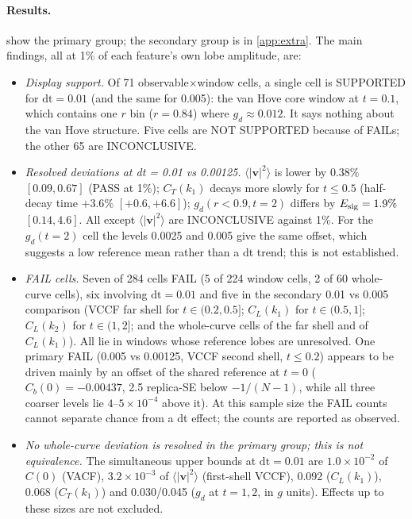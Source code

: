 \documentclass[11pt]{article}
\DeclareRobustCommand{\_}{\textunderscore\allowbreak}
\theoremstyle{remark}
\theoremstyle{definition}
\newcommand{\bv}{\mathbf{v}}
\begin{document}
\paragraph{Results.}
 show the primary group; the secondary group is in \cref{app:extra}. The main
findings, all at 1\% of each feature's own lobe amplitude, are:
\begin{itemize}
\item \emph{Display support.} Of 71 observable$\times$window cells, a single cell is SUPPORTED for $\mathrm{dt}=0.01$ (and the same for
0.005): the van Hove core window at $t=0.1$, which contains one $r$ bin ($r=0.84$) where $g_d\approx0.012$. It says nothing about
the van Hove structure. Five cells are NOT SUPPORTED because of FAILs; the other 65 are INCONCLUSIVE.
\item \emph{Resolved deviations at dt = 0.01 vs 0.00125.} $\langle|\bv|^2\rangle$ is lower by $0.38\%$ $[0.09,0.67]$ (PASS at
1\%); $C_T(k_1)$ decays more slowly for $t\le0.5$ (half-decay time $+3.6\%$ $[+0.6,+6.6]$); $g_d(r<0.9,t=2)$ differs by
$E_{\rm sig}=1.9\%$ $[0.14,4.6]$. All except $\langle|\bv|^2\rangle$ are INCONCLUSIVE against 1\%. For the $g_d(t=2)$ cell the levels
0.0025 and 0.005 give the same offset, which suggests a low reference mean rather than a dt trend; this is not established.
\item \emph{FAIL cells.} Seven of 284 cells FAIL (5 of 224 window cells, 2 of 60 whole-curve cells), six involving
$\mathrm{dt}=0.01$ and five in the secondary 0.01 vs 0.005 comparison (VCCF far shell for $t\in(0.2,0.5]$; $C_L(k_1)$ for
$t\in(0.5,1]$; $C_L(k_2)$ for $t\in(1,2]$; and the whole-curve cells of the far shell and of $C_L(k_1)$). All lie in windows whose
reference lobes are unresolved. One primary FAIL (0.005 vs 0.00125, VCCF second shell, $t\le0.2$) appears to be driven mainly by an
offset of the shared reference at $t=0$ ($C_b(0)=-0.00437$, 2.5 replica-SE below $-1/(N-1)$, while all three coarser levels lie
$4$--$5\times10^{-4}$ above it). At this sample size the FAIL counts cannot separate chance from a dt
effect; the counts are reported as observed.
\item \emph{No whole-curve deviation is resolved in the primary group; this is not equivalence.} The simultaneous upper bounds at
$\mathrm{dt}=0.01$ are $1.0\times10^{-2}$ of $C(0)$ (VACF), $3.2\times10^{-3}$ of $\langle|\bv|^2\rangle$ (first-shell VCCF), 0.092
($C_L(k_1)$), 0.068 ($C_T(k_1)$) and 0.030/0.045 ($g_d$ at $t=1,2$, in $g$ units). Effects up to these sizes are not excluded.

\end{itemize}
\end{document}
